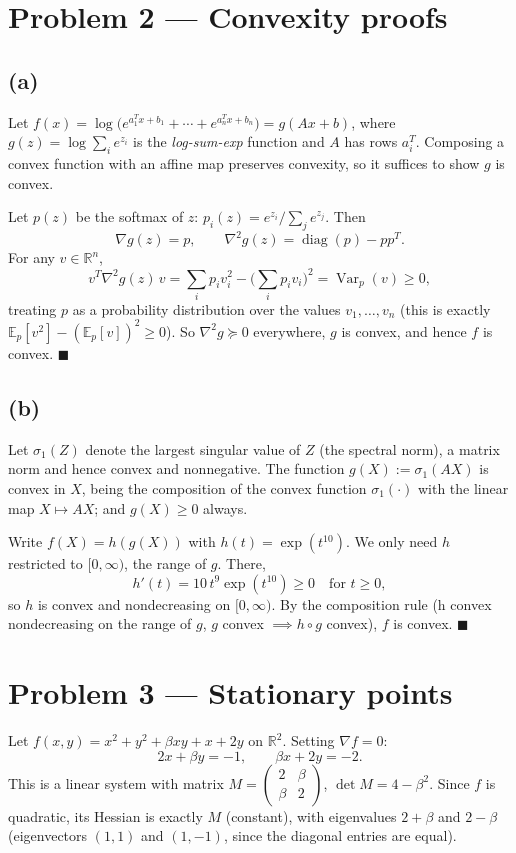 \documentclass[11pt]{article}
\newcommand{\R}{\mathbb{R}}
\begin{document}
\section*{Problem 2 --- Convexity proofs}

\subsection*{(a)}
Let $f(x) = \log\Big(e^{a_1^Tx+b_1}+\cdots+e^{a_n^Tx+b_n}\Big) = g(Ax+b)$, where $g(z)=\log\sum_i e^{z_i}$ is the \emph{log-sum-exp} function and $A$ has rows $a_i^T$. Composing a convex function with an affine map preserves convexity, so it suffices to show $g$ is convex.

Let $p(z)$ be the softmax of $z$: $p_i(z) = e^{z_i}/\sum_j e^{z_j}$. Then
\[
\nabla g(z) = p, \qquad \nabla^2 g(z) = \operatorname{diag}(p) - pp^T.
\]
For any $v\in\R^n$,
\[
v^T\nabla^2 g(z)\,v = \sum_i p_i v_i^2 - \Big(\sum_i p_i v_i\Big)^2 = \operatorname{Var}_p(v) \ge 0,
\]
treating $p$ as a probability distribution over the values $v_1,\dots,v_n$ (this is exactly $\mathbb{E}_p[v^2]-(\mathbb{E}_p[v])^2\ge0$). So $\nabla^2 g \succeq 0$ everywhere, $g$ is convex, and hence $f$ is convex. $\blacksquare$

\subsection*{(b)}
Let $\sigma_1(Z)$ denote the largest singular value of $Z$ (the spectral norm), a matrix norm and hence convex and nonnegative. The function $g(X) := \sigma_1(AX)$ is convex in $X$, being the composition of the convex function $\sigma_1(\cdot)$ with the linear map $X\mapsto AX$; and $g(X)\ge0$ always.

Write $f(X) = h(g(X))$ with $h(t) = \exp(t^{10})$. We only need $h$ restricted to $[0,\infty)$, the range of $g$. There,
\[
h'(t) = 10\,t^{9}\exp(t^{10}) \ge 0 \quad\text{for } t\ge0,
\]
so $h$ is convex and nondecreasing on $[0,\infty)$. By the composition rule (h convex nondecreasing on the range of $g$, $g$ convex $\implies h\circ g$ convex), $f$ is convex. $\blacksquare$

\section*{Problem 3 --- Stationary points}

Let $f(x,y) = x^2+y^2+\beta xy + x + 2y$ on $\R^2$. Setting $\nabla f = 0$:
\[
2x+\beta y = -1, \qquad \beta x + 2y = -2.
\]
This is a linear system with matrix $M=\begin{pmatrix}2&\beta\\ \beta&2\end{pmatrix}$, $\det M = 4-\beta^2$. Since $f$ is quadratic, its Hessian is exactly $M$ (constant), with eigenvalues $2+\beta$ and $2-\beta$ (eigenvectors $(1,1)$ and $(1,-1)$, since the diagonal entries are equal).
\end{document}
